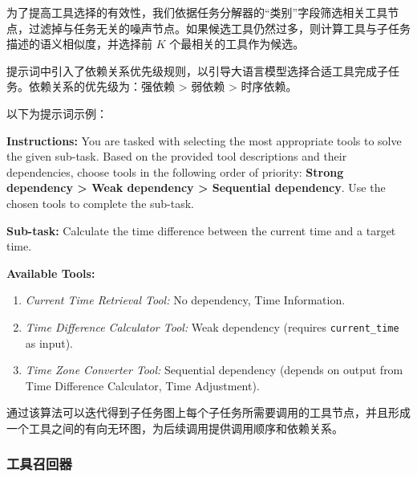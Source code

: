 为了提高工具选择的有效性，我们依据任务分解器的“类别”字段筛选相关工具节点，过滤掉与任务无关的噪声节点。如果候选工具仍然过多，则计算工具与子任务描述的语义相似度，并选择前 $K$ 个最相关的工具作为候选。

提示词中引入了依赖关系优先级规则，以引导大语言模型选择合适工具完成子任务。依赖关系的优先级为：强依赖 > 弱依赖 > 时序依赖。

以下为提示词示例：


\begin{center}
\begin{tcolorbox}[colback=bgcolor, colframe=black, width=0.85\textwidth, boxrule=0.5mm, coltitle=white, colbacktitle=titlecolor, title=Example Prompt for Tool Selection]

\textbf{Instructions:} You are tasked with selecting the most appropriate tools to solve the given sub-task. Based on the provided tool descriptions and their dependencies, choose tools in the following order of priority: \textbf{Strong dependency > Weak dependency > Sequential dependency}. Use the chosen tools to complete the sub-task.

\textbf{Sub-task:} Calculate the time difference between the current time and a target time.

\textbf{Available Tools:}
\begin{enumerate}
    \item \textit{Current Time Retrieval Tool:} No dependency, Time Information.
    \item \textit{Time Difference Calculator Tool:} Weak dependency (requires \texttt{current\_time} as input).
    \item \textit{Time Zone Converter Tool:} Sequential dependency (depends on output from Time Difference Calculator, Time Adjustment).
\end{enumerate}

\end{tcolorbox}
\end{center}

通过该算法可以迭代得到子任务图上每个子任务所需要调用的工具节点，并且形成一个工具之间的有向无环图，为后续调用提供调用顺序和依赖关系。

\subsubsection{工具召回器}

